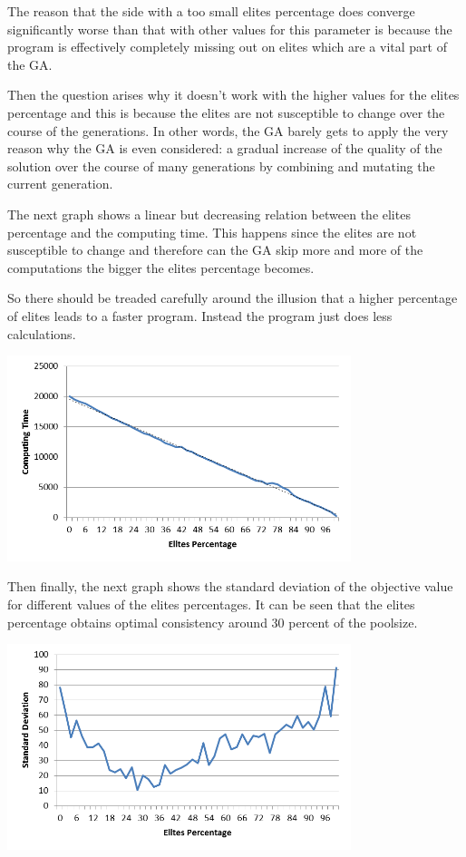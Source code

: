 \par The reason that the side with a too small elites percentage does converge significantly worse than that with other values for this parameter is because the program is effectively completely missing out on elites which are a vital part of the GA.
\vspace{5mm}
\par Then the question arises why it doesn’t work with the higher values for the elites percentage and this is because the elites are not susceptible to change over the course of the generations. In other words, the GA barely gets to apply the very reason why the GA is even considered: a gradual increase of the quality of the solution over the course of many generations by combining and mutating the current generation.
\par
The next graph shows a linear but decreasing relation between the elites percentage and the computing time. This happens since the elites are not susceptible to change and therefore can the GA skip more and more of the computations the bigger the elites percentage becomes.
\par
So there should be treaded carefully around the illusion that a higher percentage of elites leads to a faster program. Instead the program just does less calculations.
\par
\begin{centering}
	\includegraphics[height=6cm]{CTEP}
\end{centering}
Then finally, the next graph shows the standard deviation of the objective value for different values of the elites percentages. It can be seen that the elites percentage obtains optimal consistency around 30 percent of the poolsize.
\par

	\includegraphics[height=6cm]{SDEP}



